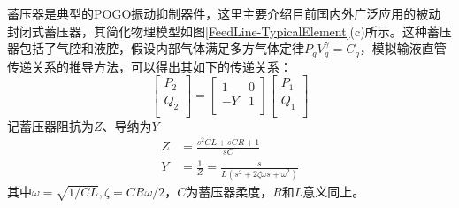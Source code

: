 \begin{enumerate}[label=\textbf{\Roman*.}, align=left, leftmargin=0pt, listparindent=\parindent, itemindent=!, labelwidth=\parindent, labelsep=0pt, itemsep=1em]
  蓄压器是典型的POGO振动抑制器件，这里主要介绍目前国内外广泛应用的被动封闭式蓄压器，其简化物理模型如图\ref{FeedLine-TypicalElement}(c)所示。这种蓄压器包括了气腔和液腔，假设内部气体满足多方气体定律$P_gV_g^{\gamma}=C_g$，模拟输液直管传递关系的推导方法，可以得出其如下的传递关系：
  \begin{equation}
    \left[ \begin{matrix}
        {P_2} \\
        {Q_2} \\
      \end{matrix} \right]=\left[ \begin{matrix}
        1  & 0 \\
        -Y & 1 \\
      \end{matrix} \right]\left[ \begin{matrix}
        {P_1} \\
        {Q_1} \\
      \end{matrix} \right]
  \end{equation}
  记蓄压器阻抗为$Z$、导纳为$Y$
  \begin{align}
    Z & =\frac{s^2CL+sCR+1}{sC} \nonumber                                                         \\
    Y & =\frac{1}{Z}=\frac{s}{\displaystyle L\left(s^2+2\zeta\omega s+\omega^2 \right)} \nonumber
  \end{align}
  其中$\omega=\sqrt{1/CL},\zeta=CR\omega/2$，$C$为蓄压器柔度，$R$和$L$意义同上。
\end{enumerate}

